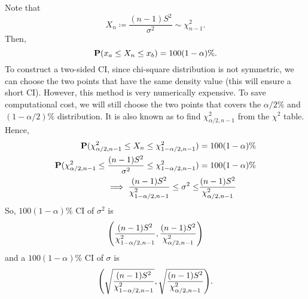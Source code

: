 \begin{prf}
	Note that \[X_n\coloneqq\dfrac{(n-1)S^2}{\sigma^2}\sim\chi_{n-1}^2.\] Then, \[\P(x_a\leq X_n\leq x_b)=100(1-\alpha)\%.\] To construct a two-sided CI, since chi-square distribution is not symmetric, we can choose the two points that have the same density value (this will ensure a short CI). However, this method is very numerically expensive. To save computational cost, we will still choose the two points that covers the $\alpha/2\%$ and $(1-\alpha/2)\%$ distribution. It is also known as to find $\chi_{\alpha/2,n-1}^2$ from the $\chi^2$ table. Hence, \begin{align*}\P(\chi_{\alpha/2,n-1}^2\leq X_n\leq \chi_{1-\alpha/2,n-1}^2)&=100(1-\alpha)\%\\\P(\chi_{\alpha/2,n-1}^2\leq \dfrac{(n-1)S^2}{\sigma^2}\leq \chi_{1-\alpha/2,n-1}^2)&=100(1-\alpha)\%\\\implies\dfrac{(n-1)S^2}{\chi_{1-\alpha/2,n-1}^2}\leq\sigma^2\leq&\dfrac{(n-1)S^2}{\chi_{\alpha/2,n-1}^2}\end{align*}So, $100(1-\alpha)\%$ CI of $\sigma^2$ is \[\qty(\dfrac{(n-1)S^2}{\chi_{1-\alpha/2,n-1}^2},\dfrac{(n-1)S^2}{\chi_{\alpha/2,n-1}^2})\] and a $100(1-\alpha)\%$ CI of $\sigma$ is \[\qty(\sqrt{\dfrac{(n-1)S^2}{\chi_{1-\alpha/2,n-1}^2}},\sqrt{\dfrac{(n-1)S^2}{\chi_{\alpha/2,n-1}^2}}).\]
\end{prf}


